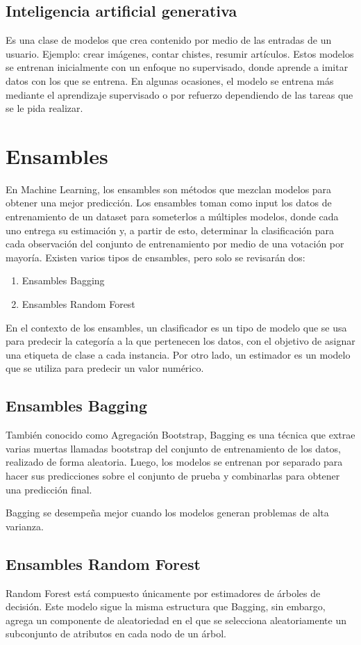 \documentclass[a4paper, 12pt]{book}
\begin{document}
\subsection{Inteligencia artificial generativa}
Es una clase de modelos que crea contenido por medio de las entradas de un usuario. Ejemplo: crear imágenes, contar chistes, resumir artículos. Estos modelos se entrenan inicialmente con un enfoque no supervisado, donde aprende a imitar datos con los que se entrena. En algunas ocasiones, el modelo se entrena más mediante el aprendizaje supervisado o por refuerzo dependiendo de las tareas que se le pida realizar.

\section{Ensambles}
En Machine Learning, los ensambles son métodos que mezclan modelos para obtener una mejor predicción. Los ensambles toman como input los datos de entrenamiento de un dataset para someterlos a múltiples modelos, donde cada uno entrega su estimación y, a partir de esto, determinar la clasificación para cada observación del conjunto de entrenamiento por medio de una votación por mayoría. Existen varios tipos de ensambles, pero solo se revisarán dos:
\begin{enumerate}
	\item Ensambles Bagging
	\item Ensambles Random Forest
\end{enumerate}
En el contexto de los ensambles, un clasificador es un tipo de modelo que se usa para predecir la categoría a la que pertenecen los datos, con el objetivo de asignar una etiqueta de clase a cada instancia. Por otro lado, un estimador es un modelo que se utiliza para predecir un valor numérico.

\subsection{Ensambles Bagging}
También conocido como Agregación Bootstrap, Bagging es una técnica que extrae varias muertas llamadas bootstrap del conjunto de entrenamiento de los datos, realizado de forma aleatoria. Luego, los modelos se entrenan por separado para hacer sus predicciones sobre el conjunto de prueba y combinarlas para obtener una predicción final.

Bagging se desempeña mejor cuando los modelos generan problemas de alta varianza.
\subsection{Ensambles Random Forest}
Random Forest está compuesto únicamente por estimadores de árboles de decisión. Este modelo sigue la misma estructura que Bagging, sin embargo, agrega un componente de aleatoriedad en el que se selecciona aleatoriamente un subconjunto de atributos en cada nodo de un árbol.
\end{document}

